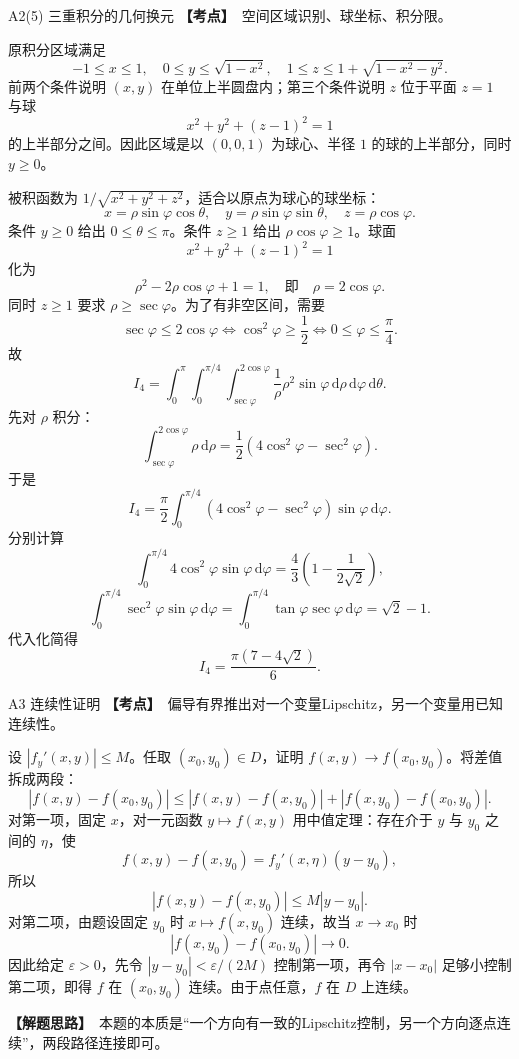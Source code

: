 \documentclass[UTF8,zihao=-4,openany]{ctexbook}
\newcommand{\dd}{\,\mathrm{d}}
\newcommand{\thinking}{\textcolor{mainblue}{\bfseries【解题思路】}}
\newcommand{\point}{\textcolor{warnred}{\bfseries【考点】}}
\begin{document}
\begin{solutionbox}{A2(5) 三重积分的几何换元}
\point\ 空间区域识别、球坐标、积分限。

原积分区域满足
\[
-1\le x\le1,
\quad 0\le y\le\sqrt{1-x^2},
\quad 1\le z\le1+\sqrt{1-x^2-y^2}.
\]
前两个条件说明 $(x,y)$ 在单位上半圆盘内；第三个条件说明 $z$ 位于平面 $z=1$ 与球
\[
x^2+y^2+(z-1)^2=1
\]
的上半部分之间。因此区域是以 $(0,0,1)$ 为球心、半径 $1$ 的球的上半部分，同时 $y\ge0$。

被积函数为 $1/\sqrt{x^2+y^2+z^2}$，适合以原点为球心的球坐标：
\[
x=\rho\sin\varphi\cos\theta,
\quad y=\rho\sin\varphi\sin\theta,
\quad z=\rho\cos\varphi.
\]
条件 $y\ge0$ 给出 $0\le\theta\le\pi$。条件 $z\ge1$ 给出 $\rho\cos\varphi\ge1$。球面
\[
x^2+y^2+(z-1)^2=1
\]
化为
\[
\rho^2-2\rho\cos\varphi+1=1,
\quad\text{即}\quad \rho=2\cos\varphi.
\]
同时 $z\ge1$ 要求 $\rho\ge\sec\varphi$。为了有非空区间，需要
\[
\sec\varphi\le2\cos\varphi
\Longleftrightarrow
\cos^2\varphi\ge\frac12
\Longleftrightarrow
0\le\varphi\le\frac\pi4.
\]
故
\[
I_4=\int_0^\pi\int_0^{\pi/4}\int_{\sec\varphi}^{2\cos\varphi}\frac1\rho \rho^2\sin\varphi\dd\rho\dd\varphi\dd\theta.
\]
先对 $\rho$ 积分：
\[
\int_{\sec\varphi}^{2\cos\varphi}\rho\dd\rho
=\frac12(4\cos^2\varphi-\sec^2\varphi).
\]
于是
\[
I_4=\frac\pi2\int_0^{\pi/4}(4\cos^2\varphi-\sec^2\varphi)\sin\varphi\dd\varphi.
\]
分别计算
\[
\int_0^{\pi/4}4\cos^2\varphi\sin\varphi\dd\varphi
=\frac43\left(1-\frac{1}{2\sqrt2}\right),
\]
\[
\int_0^{\pi/4}\sec^2\varphi\sin\varphi\dd\varphi
=\int_0^{\pi/4}\tan\varphi\sec\varphi\dd\varphi
=\sqrt2-1.
\]
代入化简得
\[
I_4=\boxed{\frac{\pi(7-4\sqrt2)}{6}}.
\]
\end{solutionbox}

\begin{solutionbox}{A3 连续性证明}
\point\ 偏导有界推出对一个变量Lipschitz，另一个变量用已知连续性。

设 $|f_y'(x,y)|\le M$。任取 $(x_0,y_0)\in D$，证明 $f(x,y)\to f(x_0,y_0)$。将差值拆成两段：
\[
|f(x,y)-f(x_0,y_0)|\le |f(x,y)-f(x,y_0)|+|f(x,y_0)-f(x_0,y_0)|.
\]
对第一项，固定 $x$，对一元函数 $y\mapsto f(x,y)$ 用中值定理：存在介于 $y$ 与 $y_0$ 之间的 $\eta$，使
\[
f(x,y)-f(x,y_0)=f_y'(x,\eta)(y-y_0),
\]
所以
\[
|f(x,y)-f(x,y_0)|\le M|y-y_0|.
\]
对第二项，由题设固定 $y_0$ 时 $x\mapsto f(x,y_0)$ 连续，故当 $x\to x_0$ 时
\[
|f(x,y_0)-f(x_0,y_0)|\to0.
\]
因此给定 $\varepsilon>0$，先令 $|y-y_0|<\varepsilon/(2M)$ 控制第一项，再令 $|x-x_0|$ 足够小控制第二项，即得 $f$ 在 $(x_0,y_0)$ 连续。由于点任意，$f$ 在 $D$ 上连续。

\thinking\ 本题的本质是“一个方向有一致的Lipschitz控制，另一个方向逐点连续”，两段路径连接即可。
\end{solutionbox}
\end{document}
